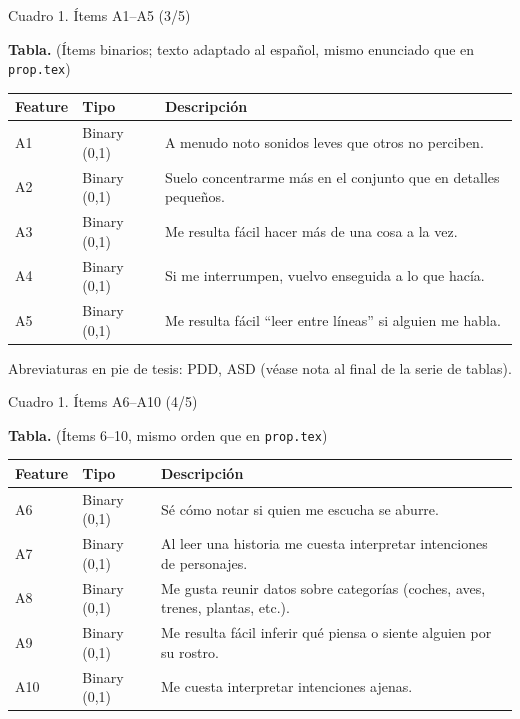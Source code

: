 \documentclass[11pt]{beamer}
\begin{document}
\begin{frame}{Cuadro 1. Ítems A1--A5 (3/5)}
  \vspace{-0.3em}
  \begin{center}
    \scriptsize
    \textbf{Tabla.} (Ítems binarios; texto adaptado al español, mismo enunciado que en \texttt{prop.tex})
  \end{center}
  \vspace{0.2em}
  {\tiny
  \begin{tabularx}{\linewidth}{@{}l l L@{}}
    \toprule
    \textbf{Feature} & \textbf{Tipo} & \textbf{Descripción} \\
    \midrule
    A1 & Binary (0,1) & A menudo noto sonidos leves que otros no perciben. \\
    A2 & Binary (0,1) & Suelo concentrarme más en el conjunto que en detalles pequeños. \\
    A3 & Binary (0,1) & Me resulta fácil hacer más de una cosa a la vez. \\
    A4 & Binary (0,1) & Si me interrumpen, vuelvo enseguida a lo que hacía. \\
    A5 & Binary (0,1) & Me resulta fácil ``leer entre líneas'' si alguien me habla. \\
    \bottomrule
  \end{tabularx}
  }
  \vspace{0.25em}
  \begin{center}
  {\tiny Abreviaturas en pie de tesis: PDD, ASD (véase nota al final de la serie de tablas).}
  \end{center}
\end{frame}

\begin{frame}{Cuadro 1. Ítems A6--A10 (4/5)}
  \vspace{-0.3em}
  \begin{center}
    \scriptsize
    \textbf{Tabla.} (Ítems 6--10, mismo orden que en \texttt{prop.tex})
  \end{center}
  \vspace{0.2em}
  {\tiny
  \begin{tabularx}{\linewidth}{@{}l l L@{}}
    \toprule
    \textbf{Feature} & \textbf{Tipo} & \textbf{Descripción} \\
    \midrule
    A6 & Binary (0,1) & Sé cómo notar si quien me escucha se aburre. \\
    A7 & Binary (0,1) & Al leer una historia me cuesta interpretar intenciones de personajes. \\
    A8 & Binary (0,1) & Me gusta reunir datos sobre categorías (coches, aves, trenes, plantas, etc.). \\
    A9 & Binary (0,1) & Me resulta fácil inferir qué piensa o siente alguien por su rostro. \\
    A10 & Binary (0,1) & Me cuesta interpretar intenciones ajenas. \\
    \bottomrule
  \end{tabularx}
  }
\end{frame}
\end{document}
